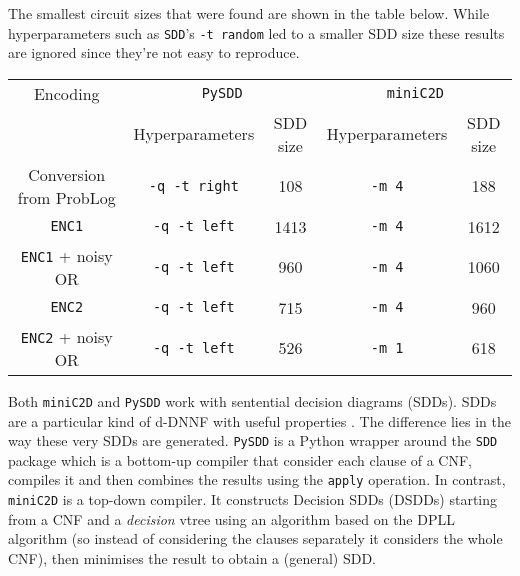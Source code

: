 \par\noindent The smallest circuit sizes that were found are shown in the table below. While hyperparameters such as \texttt{SDD}'s \texttt{-t random} led to a smaller SDD size these results are ignored since they're not easy to reproduce. 
\begin{center}
\begin{tabular}{c|cc|cc}
Encoding & \multicolumn{2}{c}{\texttt{PySDD}} & \multicolumn{2}{|c}{\texttt{miniC2D}} \\
& Hyperparameters & SDD size & Hyperparameters & SDD size \\\hline
Conversion from ProbLog & \texttt{-q -t right} & 108 & \texttt{-m 4} & 188 \\
\texttt{ENC1} & \texttt{-q -t left} & 1413 & \texttt{-m 4} &1612\\
\texttt{ENC1} + noisy OR & \texttt{-q -t left} & 960 & \texttt{-m 4} & 1060\\
\texttt{ENC2} & \texttt{-q -t left} & 715 & \texttt{-m 4} & 960\\
\texttt{ENC2} + noisy OR & \texttt{-q -t left} & 526 & \texttt{-m 1} & 618\\
\end{tabular}
\end{center}

\par\noindent Both \texttt{miniC2D} and \texttt{PySDD} work with sentential decision diagrams (SDDs). SDDs are a particular kind of d-DNNF with useful properties \cite{youtube}. The difference lies in the way these very SDDs are generated. \texttt{PySDD} is a Python wrapper around the \texttt{SDD} package which is a bottom-up compiler that consider each clause of a CNF, compiles it and then combines the results using the \texttt{apply} operation. In contrast, \texttt{miniC2D} is a top-down compiler. It constructs Decision SDDs (DSDDs) starting from a CNF and a \textit{decision} vtree using an algorithm based on the DPLL algorithm (so instead of considering the clauses separately it considers the whole CNF), then minimises the result to obtain a (general) SDD.
